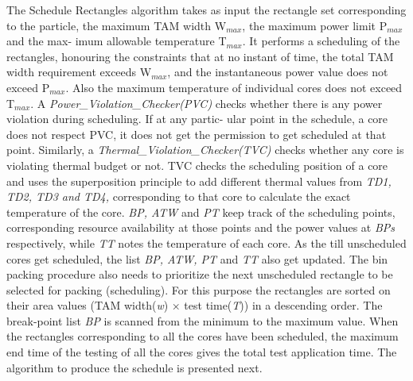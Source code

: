 \documentclass[conference]{IEEEtran}
\begin{document}
The Schedule Rectangles algorithm takes as input the
rectangle set corresponding to the particle, the maximum TAM
width W$_{max}$, the maximum power limit P$_{max}$ and the max-
imum allowable temperature T$_{max}$. It performs a scheduling
of the rectangles, honouring the constraints that at no instant
of time, the total TAM width requirement exceeds W$_{max}$, and
the instantaneous power value does not exceed P$_{max}$. Also
the maximum temperature of individual cores does not exceed
T$_{max}$. A \textit{Power\_Violation\_Checker(PVC)} checks whether
there is any power violation during scheduling. If at any partic-
ular point in the schedule, a core does not respect PVC, it does
not get the permission to get scheduled at that point. Similarly,
a \textit{Thermal\_Violation\_Checker(TVC)} checks whether any
core is violating thermal budget or not. TVC checks the
scheduling position of a core and uses the superposition
principle to add different thermal values from \textit{TD1, TD2,
TD3 and TD4,} corresponding to that core to calculate the
exact temperature of the core. \textit{BP, ATW} and \textit{PT} keep track
of the scheduling points, corresponding resource availability at
those points and the power values at \textit{BPs} respectively, while
\textit{TT} notes the temperature of each core. As the till unscheduled
cores get scheduled, the list \textit{BP, ATW, PT} and \textit{TT} also get
updated. The bin packing procedure also needs to prioritize
the next unscheduled rectangle to be selected for packing
(scheduling). For this purpose the rectangles are sorted on their
area values (TAM width(\textit{w}) × test time(\textit{T})) in a descending
order. The break-point list \textit{BP} is scanned from the minimum
to the maximum value. When the rectangles corresponding to
all the cores have been scheduled, the maximum end time of
the testing of all the cores gives the total test application time.
The algorithm to produce the schedule is presented next.
\end{document}
